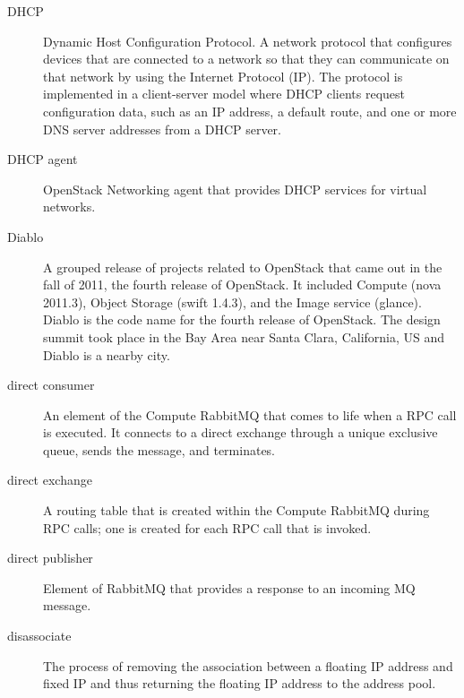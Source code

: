 \documentclass[letterpaper,10pt,english]{sphinxmanual}
\begin{document}
\begin{description}
\item[{DHCP}] \leavevmode{}\label{_source/glossary:term-dhcp}
Dynamic Host Configuration Protocol. A network protocol that
configures devices that are connected to a network so that they can
communicate on that network by using the Internet Protocol (IP). The
protocol is implemented in a client-server model where DHCP clients
request configuration data, such as an IP address, a default route,
and one or more DNS server addresses from a DHCP server.

\item[{DHCP agent}] \leavevmode{}\label{_source/glossary:term-dhcp-agent}
OpenStack Networking agent that provides DHCP services
for virtual networks.

\item[{Diablo}] \leavevmode{}\label{_source/glossary:term-diablo}
A grouped release of projects related to OpenStack that came out
in the fall of 2011, the fourth release of OpenStack. It included
Compute (nova 2011.3), Object Storage (swift 1.4.3), and the Image
service (glance).
Diablo is the code name for the fourth release of
OpenStack. The design summit took place in
the Bay Area near Santa Clara,
California, US and Diablo is a nearby city.

\item[{direct consumer}] \leavevmode{}\label{_source/glossary:term-direct-consumer}
An element of the Compute RabbitMQ that comes to life when a RPC
call is executed. It connects to a direct exchange through a unique
exclusive queue, sends the message, and terminates.

\item[{direct exchange}] \leavevmode{}\label{_source/glossary:term-direct-exchange}
A routing table that is created within the Compute RabbitMQ
during RPC calls; one is created for each RPC call that is
invoked.

\item[{direct publisher}] \leavevmode{}\label{_source/glossary:term-direct-publisher}
Element of RabbitMQ that provides a response to an incoming MQ
message.

\item[{disassociate}] \leavevmode{}\label{_source/glossary:term-disassociate}
The process of removing the association between a floating IP
address and fixed IP and thus returning the floating IP address to the
address pool.


\end{description}
\end{document}
